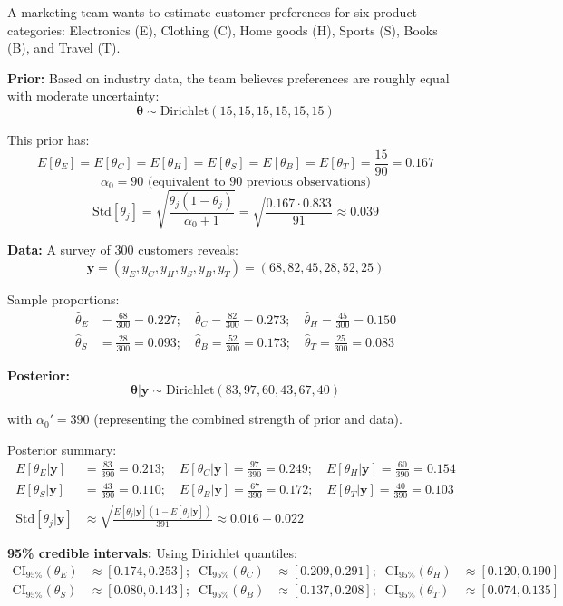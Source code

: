 \begin{examplebox}
\begin{example}
A marketing team wants to estimate customer preferences for six product categories: Electronics (E), Clothing (C), Home goods (H), Sports (S), Books (B), and Travel (T).

\textbf{Prior:} Based on industry data, the team believes preferences are roughly equal with moderate uncertainty:
$$\boldsymbol{\theta} \sim \text{Dirichlet}(15, 15, 15, 15, 15, 15)$$

This prior has:
$$E[\theta_E] = E[\theta_C] = E[\theta_H] = E[\theta_S] = E[\theta_B] = E[\theta_T] = \frac{15}{90} = 0.167$$
$$\alpha_0 = 90 \text{ (equivalent to 90 previous observations)}$$
$$\text{Std}[\theta_j] = \sqrt{\frac{\theta_j(1-\theta_j)}{\alpha_0+1}} = \sqrt{\frac{0.167 \cdot 0.833}{91}} \approx 0.039$$

\textbf{Data:} A survey of 300 customers reveals:
$$\mathbf{y} = (y_E, y_C, y_H, y_S, y_B, y_T) = (68, 82, 45, 28, 52, 25)$$

Sample proportions:
\begin{align*}
\hat{\theta}_E &= \frac{68}{300} = 0.227; \quad \hat{\theta}_C = \frac{82}{300} = 0.273; \quad \hat{\theta}_H = \frac{45}{300} = 0.150 \\
\hat{\theta}_S &= \frac{28}{300} = 0.093; \quad \hat{\theta}_B = \frac{52}{300} = 0.173; \quad \hat{\theta}_T = \frac{25}{300} = 0.083
\end{align*}

\textbf{Posterior:}
$$\boldsymbol{\theta}|\mathbf{y} \sim \text{Dirichlet}(83, 97, 60, 43, 67, 40)$$

with $\alpha_0' = 390$ (representing the combined strength of prior and data).

Posterior summary:
\begin{align*}
E[\theta_E|\mathbf{y}] &= \frac{83}{390} = 0.213; \quad E[\theta_C|\mathbf{y}] = \frac{97}{390} = 0.249; \quad E[\theta_H|\mathbf{y}] = \frac{60}{390} = 0.154 \\
E[\theta_S|\mathbf{y}] &= \frac{43}{390} = 0.110; \quad E[\theta_B|\mathbf{y}] = \frac{67}{390} = 0.172; \quad E[\theta_T|\mathbf{y}] = \frac{40}{390} = 0.103 \\
\text{Std}[\theta_j|\mathbf{y}] &\approx \sqrt{\frac{E[\theta_j|\mathbf{y}](1-E[\theta_j|\mathbf{y}])}{391}} \approx 0.016-0.022
\end{align*}

\textbf{95\% credible intervals:}
Using Dirichlet quantiles:
\begin{align*}
\text{CI}_{95\%}(\theta_E) &\approx [0.174, 0.253]; \;\; \text{CI}_{95\%}(\theta_C) &\approx [0.209, 0.291]; \;\; \text{CI}_{95\%}(\theta_H) &\approx [0.120, 0.190] \\
\text{CI}_{95\%}(\theta_S) &\approx [0.080, 0.143]; \;\; \text{CI}_{95\%}(\theta_B) &\approx [0.137, 0.208]; \;\; \text{CI}_{95\%}(\theta_T) &\approx [0.074, 0.135]
\end{align*}


\end{example}
\end{examplebox}
